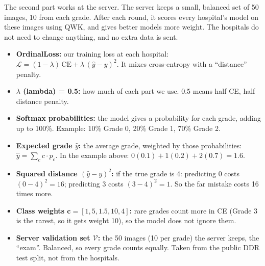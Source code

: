 \documentclass[11pt,a4paper]{article}
\newenvironment{terms}{%
  \par\smallskip\noindent{\color{accent}\small\bfseries TERMS ON THIS SLIDE}\par
  \begin{itemize}[leftmargin=1.2em,itemsep=2pt,topsep=2pt,label={\color{accent}\textbullet}]\small}%
  {\end{itemize}}
\newcommand{\term}[1]{\textbf{#1:}}
\begin{document}
The second part works at the server. The server keeps a small, balanced set of 50 images, 10 from
each grade. After each round, it scores every hospital's model on these images using QWK, and gives
better models more weight. The hospitals do not need to change anything, and no extra data is sent.
\begin{terms}
\item \term{OrdinalLoss} our training loss at each hospital:
$\mathcal{L} = (1-\lambda)\,\text{CE} + \lambda\,(\hat{y}-y)^2$. It mixes cross-entropy with a
``distance'' penalty.
\item \term{$\lambda$ (lambda) = 0.5} how much of each part we use. 0.5 means half CE, half
distance penalty.
\item \term{Softmax probabilities} the model gives a probability for each grade, adding up to 100\%.
Example: 10\% Grade 0, 20\% Grade 1, 70\% Grade 2.
\item \term{Expected grade $\hat{y}$} the average grade, weighted by those probabilities:
$\hat{y} = \sum_c c \cdot p_c$. In the example above: $0(0.1)+1(0.2)+2(0.7) = 1.6$.
\item \term{Squared distance $(\hat{y}-y)^2$} if the true grade is 4: predicting 0 costs
$(0-4)^2 = 16$; predicting 3 costs $(3-4)^2 = 1$. So the far mistake costs 16 times more.
\item \term{Class weights $\mathbf{c} = [1, 5, 1.5, 10, 4]$} rare grades count more in CE (Grade 3
is the rarest, so it gets weight 10), so the model does not ignore them.
\item \term{Server validation set $\mathcal{V}$} the 50 images (10 per grade) the server keeps, the
``exam''. Balanced, so every grade counts equally. Taken from the public DDR test split, not from
the hospitals.
\end{terms}
\end{document}
